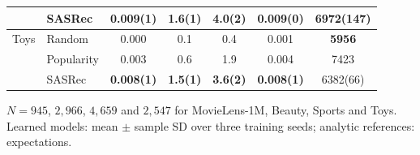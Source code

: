 \begin{table}[!htbp]
\begin{tabular*}{\textwidth}{@{\extracolsep{\fill}}llS[table-format=1.3(3)]S[table-format=2.1(3)]S[table-format=2.1(3)]S[table-format=1.3(3)]S[table-format=5.0(5)]@{}}
 & SASRec & \bfseries 0.009(1) & \bfseries 1.6(1) & \bfseries 4.0(2) & \bfseries 0.009(0) & \bfseries 6972(147)\\ %
\midrule
Toys & Random & 0.000 & 0.1 & 0.4 & 0.001 & \bfseries 5956\\ %
 & Popularity & 0.003 & 0.6 & 1.9 & 0.004 & 7423\\ %
 & SASRec & \bfseries 0.008(1) & \bfseries 1.5(1) & \bfseries 3.6(2) & \bfseries 0.008(1) & 6382(66)\\ %
\bottomrule
\end{tabular*}
\par\smallskip\noindent\begin{minipage}{\textwidth}\fontsize{8.5}{11}\selectfont $N=945$, $2{,}966$, $4{,}659$ and $2{,}547$ for MovieLens-1M, Beauty, Sports and Toys. Learned models: mean $\pm$ sample SD over three training seeds; analytic references: expectations.
\end{minipage}
\end{table}
